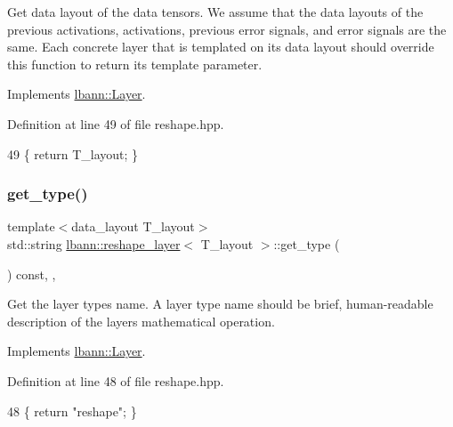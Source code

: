 Get data layout of the data tensors. We assume that the data layouts of the previous activations, activations, previous error signals, and error signals are the same. Each concrete layer that is templated on its data layout should override this function to return its template parameter. 

Implements \hyperlink{classlbann_1_1Layer_a5dfb66e81fc085997402a5e2241316bd}{lbann\+::\+Layer}.



Definition at line 49 of file reshape.\+hpp.


\begin{DoxyCode}
49 \{ \textcolor{keywordflow}{return} T\_layout; \}
\end{DoxyCode}
\mbox{\label{classlbann_1_1reshape__layer_af8ed6ed2bb208478ec7a339ee58e0aa6}} 
\subsubsection{\texorpdfstring{get\+\_\+type()}{get\_type()}}
{\footnotesize\ttfamily template$<$data\+\_\+layout T\+\_\+layout$>$ \\
std\+::string \hyperlink{classlbann_1_1reshape__layer}{lbann\+::reshape\+\_\+layer}$<$ T\+\_\+layout $>$\+::get\+\_\+type (\begin{DoxyParamCaption}{ }\end{DoxyParamCaption}) const\hspace{0.3cm}{\ttfamily [inline]}, {\ttfamily [override]}, {\ttfamily [virtual]}}

Get the layer type\textquotesingle{}s name. A layer type name should be brief, human-\/readable description of the layer\textquotesingle{}s mathematical operation. 

Implements \hyperlink{classlbann_1_1Layer_a0fa0ea9160b490c151c0a17fde4f7239}{lbann\+::\+Layer}.



Definition at line 48 of file reshape.\+hpp.


\begin{DoxyCode}
48 \{ \textcolor{keywordflow}{return} \textcolor{stringliteral}{"reshape"}; \}
\end{DoxyCode}
\mbox{\label{classlbann_1_1reshape__layer_a60fd29f11e62137a0808ffe4b3730344}} 
